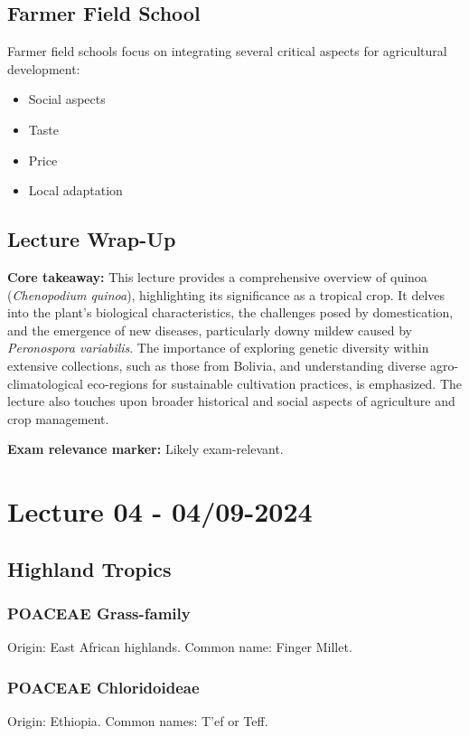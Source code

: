 \subsection{Farmer Field School} 
Farmer field schools focus on integrating several critical aspects for agricultural development: 
\begin{itemize} 
    \item Social aspects 
    \item Taste 
    \item Price 
    \item Local adaptation 
\end{itemize}


\subsection*{Lecture Wrap-Up} \textbf{Core takeaway:} 
This lecture provides a comprehensive overview of quinoa (\textit{Chenopodium quinoa}), highlighting its significance as a tropical crop. It delves into the plant's biological characteristics, the challenges posed by domestication, and the emergence of new diseases, particularly downy mildew caused by \textit{Peronospora variabilis}. The importance of exploring genetic diversity within extensive collections, such as those from Bolivia, and understanding diverse agro-climatological eco-regions for sustainable cultivation practices, is emphasized. The lecture also touches upon broader historical and social aspects of agriculture and crop management. 

\vspace{1em} 
\textbf{Exam relevance marker:} Likely exam-relevant.

\section{Lecture 04 - 04/09-2024}

\subsection{Highland Tropics} 
\subsubsection{POACEAE Grass-family} 
Origin: East African highlands. Common name: Finger Millet.

\subsubsection{POACEAE Chloridoideae} 
Origin: Ethiopia. Common names: T'ef or Teff.

